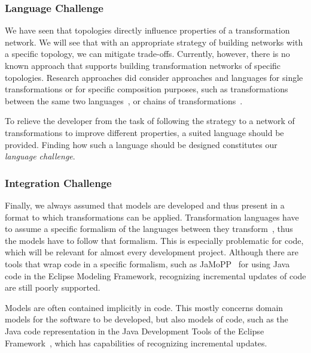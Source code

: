 \subsubsection*{Language Challenge}

We have seen that topologies directly influence properties of a transformation network.
We will see that with an appropriate strategy of building networks with a specific topology, we can mitigate trade-offs.
Currently, however, there is no known approach that supports building transformation networks of specific topologies.
Research approaches did consider approaches and languages for single transformations or for specific composition purposes, such as transformations between the same two languages~\cite{wagelaar2010a,wagelaar2011a}, or chains of transformations~\cite{pilgrim2008a, vanhooff2007UniTI-MODELS}.

To relieve the developer from the task of following the strategy to a network of transformations to improve different properties, a suited language should be provided.
Finding how such a language should be designed constitutes our \emph{language challenge}.

\subsubsection*{Integration Challenge}

Finally, we always assumed that models are developed and thus present in a format to which transformations can be applied.
Transformation languages have to assume a specific formalism of the languages between they transform~\cite{klare2017models}, thus the models have to follow that formalism.
This is especially problematic for code, which will be relevant for almost every development project.
Although there are tools that wrap code in a specific formalism, such as JaMoPP~\cite{heidenreich2009a,heidenreich2010a} for using Java code in the Eclipse Modeling Framework, recognizing incremental updates of code are still poorly supported.

Models are often contained implicitly in code.
This mostly concerns domain models for the software to be developed, but also models of code, such as the Java code representation in the Java Development Tools of the Eclipse Framework~\cite{EclipseJDT}, which has capabilities of recognizing incremental updates.

